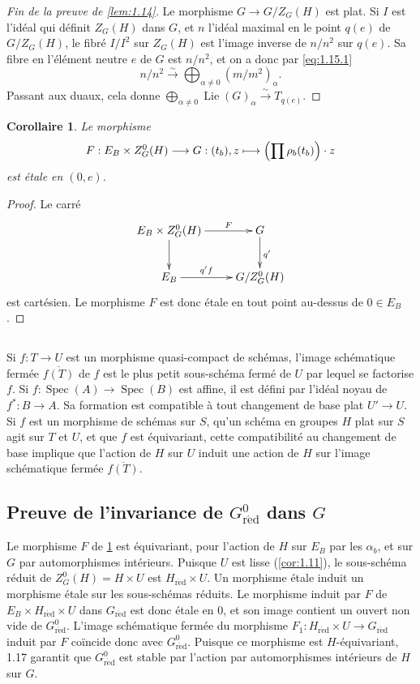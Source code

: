 \documentclass[11pt,a4paper]{article}
\theoremstyle{plain}
\newtheorem{corollary}[theorem]{Corollaire}
\theoremstyle{definition}
\DeclareMathOperator{\Spec}{Spec}
\DeclareMathOperator{\Lie}{Lie}
\newcommand{\red}{\mathrm{r\acute{e}d}}
\begin{document}
\begin{proof}[Fin de la preuve de \ref{lem:1.14}]
Le morphisme $G \to G/Z_G(H)$ est plat. Si $I$ est l'id\'eal qui d\'efinit $Z_G(H)$ dans $G$, et $n$ l'id\'eal maximal en le point $q(e)$ de $G/Z_G(H)$, le fibr\'e $I/I^2$ sur $Z_G(H)$ est l'image inverse de $n/n^2$ sur $q(e)$. Sa fibre en l'\'el\'ement neutre $e$ de $G$ est $n/n^2$, et on a donc par \eqref{eq:1.15.1}
\[
n/n^2 \xrightarrow{\sim} \bigoplus_{\alpha \neq 0} (m/m^2)_\alpha.
\]
Passant aux duaux, cela donne $\bigoplus_{\alpha \neq 0} \Lie(G)_\alpha \xrightarrow{\sim} T_{q(e)}$.
\end{proof}

\begin{corollary}\label{cor:1.16}
Le morphisme
\[
F: E_B \times Z^0_G(H) \longrightarrow G: (t_b), z \longmapsto \Bigl(\prod \rho_b(t_b)\Bigr) \cdot z
\]
est \'etale en $(0,e)$.
\end{corollary}

\begin{proof}
Le carr\'e
\[
\xymatrix{
E_B \times Z^0_G(H) \ar[r]^-{F} \ar[d] & G \ar[d]^{q'} \\
E_B \ar[r]^-{q'f} & G/Z^0_G(H)
}
\]
est cart\'esien. Le morphisme $F$ est donc \'etale en tout point au-dessus de $0 \in E_B$.
\end{proof}

\subsection{}
Si $f: T \to U$ est un morphisme quasi-compact de sch\'emas, l'image sch\'ematique ferm\'ee $\overline{f(T)}$ de $f$ est le plus petit sous-sch\'ema ferm\'e de $U$ par lequel se factorise $f$. Si $f: \Spec(A) \to \Spec(B)$ est affine, il est d\'efini par l'id\'eal noyau de $f^*: B \to A$. Sa formation est compatible \`a tout changement de base plat $U' \to U$. Si $f$ est un morphisme de sch\'emas sur $S$, qu'un sch\'ema en groupes $H$ plat sur $S$ agit sur $T$ et $U$, et que $f$ est \'equivariant, cette compatibilit\'e au changement de base implique que l'action de $H$ sur $U$ induit une action de $H$ sur l'image sch\'ematique ferm\'ee $\overline{f(T)}$.

\subsection{Preuve de l'invariance de $G^0_\red$ dans $G$}\label{sec:1.18}

Le morphisme $F$ de \ref{cor:1.16} est \'equivariant, pour l'action de $H$ sur $E_B$ par les $\alpha_b$, et sur $G$ par automorphismes int\'erieurs. Puisque $U$ est lisse (\ref{cor:1.11}), le sous-sch\'ema r\'eduit de $Z^0_G(H) = H \times U$ est $H_\red \times U$. Un morphisme \'etale induit un morphisme \'etale sur les sous-sch\'emas r\'eduits. Le morphisme induit par $F$ de $E_B \times H_\red \times U$ dans $G_\red$ est donc \'etale en $0$, et son image contient un ouvert non vide de $G^0_\red$. L'image sch\'ematique ferm\'ee du morphisme $F_1: H_\red \times U \to G_\red$ induit par $F$ co\"incide donc avec $G^0_\red$. Puisque ce morphisme est $H$-\'equivariant, 1.17 garantit que $G^0_\red$ est stable par l'action par automorphismes int\'erieurs de $H$ sur $G$.
\end{document}
